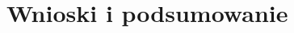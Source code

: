 \documentclass[eng,printmode,oneside]{mgr}
\begin{document}
\chapter{Wnioski i podsumowanie}

\listoffigures
\listoftables
\lstlistoflistings
\end{document}
